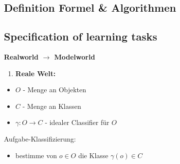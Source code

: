 \documentclass[11pt,a4paper]{article}
\begin{document}
\begin{flushleft}
\section{Definition Formel \& Algorithmen}

\subsection{Specification of learning tasks}
    \textbf{Realworld $\rightarrow$ Modelworld} \newline
    \begin{enumerate}
    \item \textbf{Reale Welt:}
    \end{enumerate}
    \begin{itemize}
        \item $O$ - Menge an Objekten
        \item $C$ - Menge an Klassen
        \item $\gamma: O \rightarrow C$ - idealer Classifier für $O$
    \end{itemize}
    \quad Aufgabe-Klassifizierung:
    \begin{itemize}
        \item bestimme von $o \in O$ die Klasse $\gamma(o) \in C$
    \end{itemize}
    

\end{flushleft}
\end{document}

